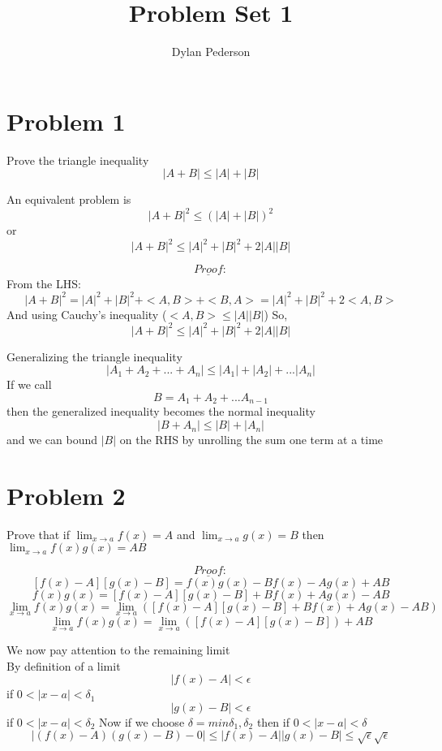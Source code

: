 \documentclass{article}
\begin{document}
\title{Problem Set 1}
\author{Dylan Pederson}

\maketitle

\section{Problem 1}

Prove the triangle inequality
$$|A+B| \leq |A| + |B| $$

An equivalent problem is
$$ |A+B|^2 \leq (|A|+|B|)^2 $$
or $$ |A+B|^2 \leq |A|^2+|B|^2+2|A||B| $$

$$ \underline{Proof}:  $$
From the LHS:
$$ |A+B|^2 = |A|^2 + |B|^2 + <A,B> + <B,A> = |A|^2 + |B|^2 + 2<A,B> $$
And using Cauchy's inequality ($<A,B> \leq |A||B|$)
So, $$ |A+B|^2 \leq |A|^2+|B|^2+2|A||B| $$

Generalizing the triangle inequality
$$ |A_1 + A_2 + ... + A_n| \leq |A_1| + |A_2| + ... |A_n| $$
If we call
$$ B = A_1 + A_2 + ... A_{n-1} $$
then the generalized inequality becomes the normal inequality
$$|B+A_n| \leq |B| + |A_n| $$
and we can bound $|B|$ on the RHS by unrolling the sum one term at a time

\section{Problem 2}
Prove that if $\lim_{x \rightarrow a}f(x) = A$ and $\lim_{x \rightarrow a} g(x) = B$ then $\lim_{x \rightarrow a} f(x)g(x) = AB$

$$\underline{Proof}: $$
$$ [f(x)-A][g(x)-B] = f(x)g(x)-Bf(x)-Ag(x)+AB $$
$$ f(x)g(x) = [f(x)-A][g(x)-B] + Bf(x) + Ag(x) - AB $$
$$ \lim_{x \rightarrow a}f(x)g(x) = \lim_{x \rightarrow a}([f(x)-A][g(x)-B] + Bf(x) + Ag(x) - AB) $$
$$ \lim_{x \rightarrow a}f(x)g(x) = \lim_{x \rightarrow a} ([f(x)-A][g(x)-B]) + AB $$

We now pay attention to the remaining limit \\
By definition of a limit
$$ |f(x)-A| < \epsilon $$ if $ 0 < |x-a| < \delta_1$
$$ |g(x)-B| < \epsilon $$ if $ 0 < |x-a| < \delta_2$
Now if we choose $ \delta = min{\delta_1, \delta_2}$
then if $ 0 < |x-a| < \delta$
$$ |(f(x)-A)(g(x)-B)-0| \leq |f(x)-A||g(x)-B| \leq \sqrt{\epsilon}\sqrt{\epsilon} $$
\end{document}
